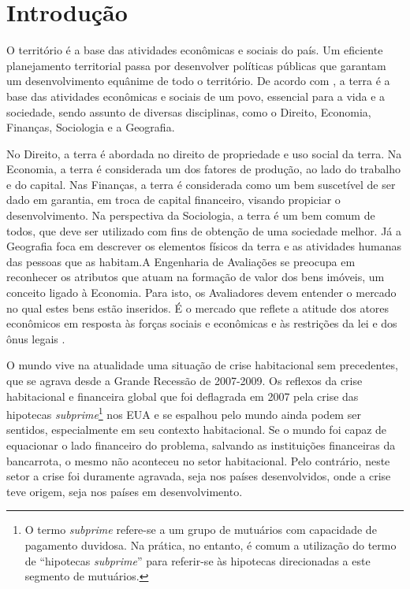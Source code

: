 \documentclass[
	12pt,				%
	oneside,			%
	a4paper,			%
	chapter=TITLE,		%
	section=TITLE,		%
	english,			%
	brazil				%
	]{abntex2}
\begin{document}
\hypertarget{intro}{%
\chapter{Introdução}\label{intro}}
\begin{refsection}

O território é a base das atividades econômicas e sociais do
país. Um eficiente planejamento territorial passa por desenvolver políticas
públicas que garantam um desenvolvimento equânime de todo o território. De
acordo com \textcite{realestate}, a terra é a base das atividades econômicas
e sociais de um povo, essencial para a vida e a sociedade, sendo assunto de
diversas disciplinas, como o Direito, Economia, Finanças, Sociologia e a
Geografia.

No Direito, a terra é abordada no direito de propriedade e uso social da terra.
Na Economia, a terra é considerada um dos fatores de produção, ao lado do
trabalho e do capital. Nas Finanças, a terra é considerada como
um bem suscetível de ser dado em garantia, em troca de capital financeiro,
visando propiciar o desenvolvimento. Na perspectiva da Sociologia, a terra é um
bem comum de todos, que deve ser utilizado com fins de obtenção de uma sociedade
melhor. Já a Geografia foca em descrever os elementos físicos da terra e as
atividades humanas das pessoas que as habitam.A Engenharia de Avaliações se
preocupa em reconhecer os atributos que atuam na formação de valor dos bens
imóveis, um conceito ligado à Economia. Para isto, os Avaliadores devem entender
o mercado no qual estes bens estão inseridos. É o mercado que reflete a atitude
dos atores econômicos em resposta às forças sociais e econômicas e às restrições
da lei e dos ônus legais \autocite[10]{realestate}.

O mundo vive na atualidade uma situação de crise
habitacional sem precedentes, que se agrava desde a Grande
Recessão de 2007-2009. Os reflexos da crise habitacional e financeira global que
foi deflagrada em 2007 pela crise das hipotecas \emph{subprime}\footnote{O termo \emph{subprime} refere-se a um grupo de mutuários com capacidade de
  pagamento duvidosa. Na prática, no entanto, é comum a utilização do termo de
  ``hipotecas \emph{subprime}'' para referir-se às hipotecas direcionadas a este segmento
  de mutuários.} nos EUA e se
espalhou pelo mundo ainda podem ser sentidos, especialmente em seu contexto
habitacional. Se o mundo foi capaz de equacionar o lado financeiro do problema,
salvando as instituições financeiras da bancarrota, o mesmo não aconteceu no
setor habitacional. Pelo contrário, neste setor a crise foi duramente agravada,
seja nos países desenvolvidos, onde a crise teve origem, seja nos países em
desenvolvimento.


\end{refsection}
\end{document}
